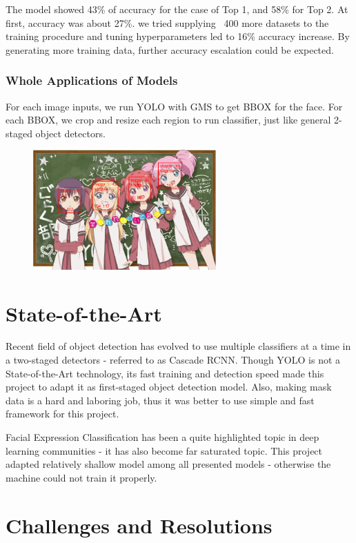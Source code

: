 \documentclass{article}
\begin{document}
The model showed 43\% of accuracy for the case of Top 1, and 58\% for Top 2. At
first, accuracy was about 27\%. we tried supplying ~400 more datasets to the
training procedure and tuning hyperparameters led to 16\% accuracy increase. By
generating more training data, further accuracy escalation could be expected.

\subsubsection{Whole Applications of Models}
For each image inputs, we run YOLO with GMS to get BBOX for the face. For each
BBOX, we crop and resize each region to run classifier, just like general
2-staged object detectors.

\begin{figure}[h]
  \centering
  \includegraphics[width=7cm]{image/yolo_class_example.png}
\end{figure}

\section{State-of-the-Art}
Recent field of object detection has evolved to use multiple classifiers at a
time in a two-staged detectors - referred to as Cascade
RCNN\cite{DBLP:journals/corr/abs-1906-09756}. Though YOLO is not a
State-of-the-Art technology, its fast training and detection speed made this
project to adapt it as first-staged object detection model. Also, making mask
data is a hard and laboring job, thus it was better to use simple and fast
framework for this project.

Facial Expression Classification has been a quite highlighted topic in deep
learning communities - it has also become far saturated topic. This project
adapted relatively shallow model among all presented models - otherwise the
machine could not train it properly.

\section{Challenges and Resolutions}
\end{document}
